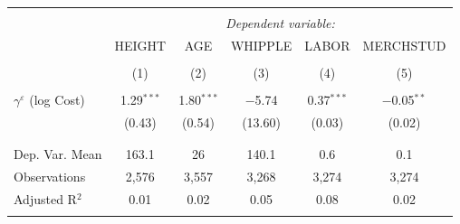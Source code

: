
\begin{tabular}{@{\extracolsep{5pt}}lccccc} 
\\[-1.8ex]\hline 
\hline \\[-1.8ex] 
 & \multicolumn{5}{c}{\textit{Dependent variable:}} \\ 
\cline{2-6} 
 & HEIGHT & AGE & WHIPPLE & LABOR & MERCHSTUD \\ 
\\[-1.8ex] & (1) & (2) & (3) & (4) & (5)\\ 
\hline \\[-1.8ex] 
 $\gamma^{\varepsilon}$ (log Cost) & 1.29$^{***}$ & 1.80$^{***}$ & $-$5.74 & 0.37$^{***}$ & $-$0.05$^{**}$ \\ 
  & (0.43) & (0.54) & (13.60) & (0.03) & (0.02) \\ 
  & & & & & \\ 
\hline \\[-1.8ex] 
Dep. Var. Mean & 163.1 & 26 & 140.1 & 0.6 & 0.1 \\ 
Observations & 2,576 & 3,557 & 3,268 & 3,274 & 3,274 \\ 
Adjusted R$^{2}$ & 0.01 & 0.02 & 0.05 & 0.08 & 0.02 \\ 
\hline 
\hline \\[-1.8ex] 
\end{tabular} 
